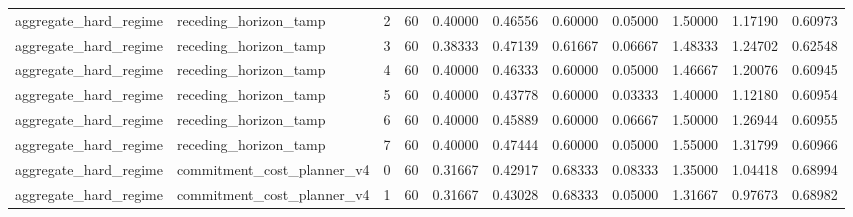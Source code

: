 \documentclass{article}
\begin{document}
\begin{table}[tbp]
{\begin{tabular}{lllllllllll}
aggregate\_hard\_regime & receding\_horizon\_tamp & 2 & 60 & 0.40000 & 0.46556 & 0.60000 & 0.05000 & 1.50000 & 1.17190 & 0.60973 \\
aggregate\_hard\_regime & receding\_horizon\_tamp & 3 & 60 & 0.38333 & 0.47139 & 0.61667 & 0.06667 & 1.48333 & 1.24702 & 0.62548 \\
aggregate\_hard\_regime & receding\_horizon\_tamp & 4 & 60 & 0.40000 & 0.46333 & 0.60000 & 0.05000 & 1.46667 & 1.20076 & 0.60945 \\
aggregate\_hard\_regime & receding\_horizon\_tamp & 5 & 60 & 0.40000 & 0.43778 & 0.60000 & 0.03333 & 1.40000 & 1.12180 & 0.60954 \\
aggregate\_hard\_regime & receding\_horizon\_tamp & 6 & 60 & 0.40000 & 0.45889 & 0.60000 & 0.06667 & 1.50000 & 1.26944 & 0.60955 \\
aggregate\_hard\_regime & receding\_horizon\_tamp & 7 & 60 & 0.40000 & 0.47444 & 0.60000 & 0.05000 & 1.55000 & 1.31799 & 0.60966 \\
aggregate\_hard\_regime & commitment\_cost\_planner\_v4 & 0 & 60 & 0.31667 & 0.42917 & 0.68333 & 0.08333 & 1.35000 & 1.04418 & 0.68994 \\
aggregate\_hard\_regime & commitment\_cost\_planner\_v4 & 1 & 60 & 0.31667 & 0.43028 & 0.68333 & 0.05000 & 1.31667 & 0.97673 & 0.68982 \\
\bottomrule
\end{tabular}
}
\end{table}

\clearpage
\end{document}
